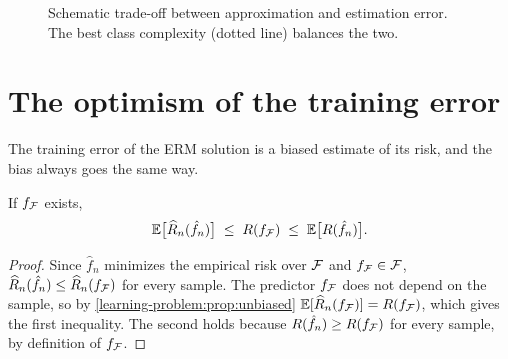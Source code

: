 \begin{notechapter}
\begin{figure}[ht]
\centering
{}
\caption{Schematic trade-off between approximation and estimation error. The
best class complexity (dotted line) balances the two.}
\label{erm:fig:tradeoff}
\end{figure}

\section{The optimism of the training error}\label{erm:sec:optimism}

The training error of the ERM solution is a biased estimate of its risk, and
the bias always goes the same way.

\begin{proposition}\label{erm:prop:optimism}
If $f_{\mathcal{F}}$ exists,
\[
  \mathbb{E}\bigl[\widehat{R}_n(\hat f_n)\bigr] \;\leq\; R(f_{\mathcal{F}}) \;\leq\; \mathbb{E}\bigl[R(\hat f_n)\bigr].
\]
\end{proposition}

\begin{proof}
Since $\hat f_n$ minimizes the empirical risk over $\mathcal{F}$ and $f_{\mathcal{F}}\in\mathcal{F}$,
$\widehat{R}_n(\hat f_n) \leq \widehat{R}_n(f_{\mathcal{F}})$ for every sample. The predictor
$f_{\mathcal{F}}$ does not depend on the sample, so by \cref{learning-problem:prop:unbiased}
$\mathbb{E}[\widehat{R}_n(f_{\mathcal{F}})] = R(f_{\mathcal{F}})$, which gives the first inequality. The second
holds because $R(\hat f_n) \geq R(f_{\mathcal{F}})$ for every sample, by definition
of $f_{\mathcal{F}}$.
\end{proof}


\end{notechapter}
